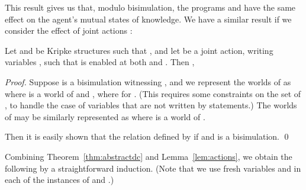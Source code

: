 \documentclass[]{llncs}
\begin{document}
This result gives us that, modulo bisimulation, the programs  and  have the
same effect on the agent's mutual states of knowledge. We have a similar result if we consider 
the effect of joint actions : 

\begin{lemma} \label{lem:actions} 
Let  and  be Kripke structures such that , and 
let  be a joint action, writing variables , such that  is enabled at both  and . 
Then ,
\end{lemma} 
\begin{proof} 
Suppose  is a bisimulation witnessing , 
and we represent the worlds of 
as  where  is a  world of  
and , where 
 for . 
(This requires some constraints on the set of , to handle the case of 
variables  that are not written by  statements.) 
The worlds of  may be similarly represented as  where  is a world of . 

Then it is easily shown that the  relation  defined by 
 if  and  
is a bisimulation.  \qed
\end{proof} 


Combining Theorem~\ref{thm:abstractdc} and Lemma~\ref{lem:actions}, we obtain the following
by a straightforward induction.
(Note that we 
use fresh variables  
 and  in each of the instances of  and .)
\end{document}
